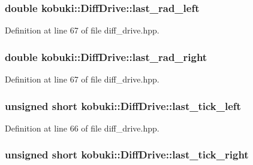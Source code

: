 \subsubsection[{last\-\_\-rad\-\_\-left}]{\setlength{\rightskip}{0pt plus 5cm}double {\bf kobuki\-::\-Diff\-Drive\-::last\-\_\-rad\-\_\-left}\hspace{0.3cm}{\ttfamily  [private]}}\label{classkobuki_1_1DiffDrive_a3a5f3a028bad67a5dac076e3fc9d8d22}


\-Definition at line 67 of file diff\-\_\-drive.\-hpp.

\subsubsection[{last\-\_\-rad\-\_\-right}]{\setlength{\rightskip}{0pt plus 5cm}double {\bf kobuki\-::\-Diff\-Drive\-::last\-\_\-rad\-\_\-right}\hspace{0.3cm}{\ttfamily  [private]}}\label{classkobuki_1_1DiffDrive_a799258e6537987af4f1e2a3d1750e9a3}


\-Definition at line 67 of file diff\-\_\-drive.\-hpp.

\subsubsection[{last\-\_\-tick\-\_\-left}]{\setlength{\rightskip}{0pt plus 5cm}unsigned short {\bf kobuki\-::\-Diff\-Drive\-::last\-\_\-tick\-\_\-left}\hspace{0.3cm}{\ttfamily  [private]}}\label{classkobuki_1_1DiffDrive_aae2baf5652d3cf5d17b9430df74460bc}


\-Definition at line 66 of file diff\-\_\-drive.\-hpp.

\subsubsection[{last\-\_\-tick\-\_\-right}]{\setlength{\rightskip}{0pt plus 5cm}unsigned short {\bf kobuki\-::\-Diff\-Drive\-::last\-\_\-tick\-\_\-right}\hspace{0.3cm}{\ttfamily  [private]}}\label{classkobuki_1_1DiffDrive_a5486e5f69560bf760c44893babcc03a4}



